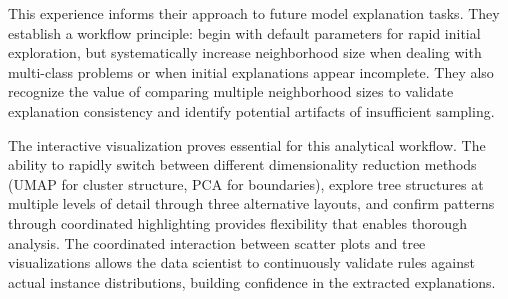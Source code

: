 This experience informs their approach to future model explanation tasks. They establish a workflow principle: begin with default parameters for rapid initial exploration, but systematically increase neighborhood size when dealing with multi-class problems or when initial explanations appear incomplete. They also recognize the value of comparing multiple neighborhood sizes to validate explanation consistency and identify potential artifacts of insufficient sampling.

The interactive visualization proves essential for this analytical workflow. The ability to rapidly switch between different dimensionality reduction methods (UMAP for cluster structure, PCA for boundaries), explore tree structures at multiple levels of detail through three alternative layouts, and confirm patterns through coordinated highlighting provides flexibility that enables thorough analysis. The coordinated interaction between scatter plots and tree visualizations allows the data scientist to continuously validate rules against actual instance distributions, building confidence in the extracted explanations.